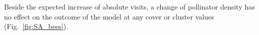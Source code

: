 Beside the expected increase of absolute visits, a change of pollinator density has no effect on the outcome of the model at any cover or cluster values (Fig.~\ref{fig:SA_bees}).




